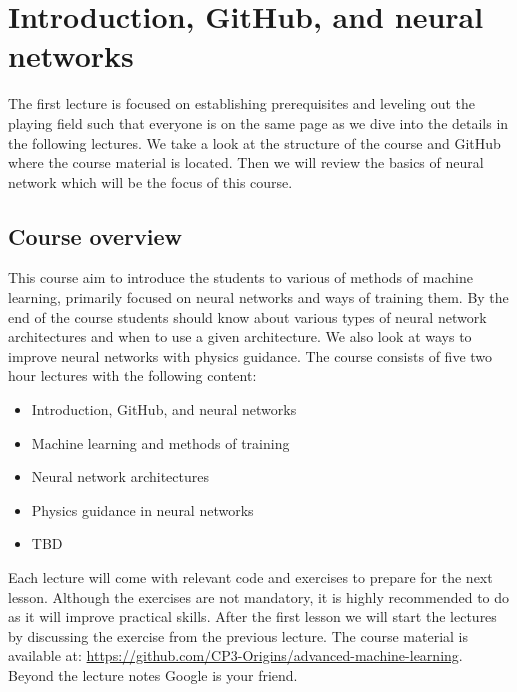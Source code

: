 \documentclass[12pt,a4paper]{article} %
\title{\titel}
\author{\navn}
\date{\dato}
\numberwithin{equation}{section}
\begin{document}
	
	\maketitle

\section{Introduction, GitHub, and neural networks}\label{sec:lecture1}
	The first lecture is focused on establishing prerequisites and leveling out the playing field such that everyone is on the same page as we dive into the details in the following lectures. We take a look at the structure of the course and GitHub where the course material is located. Then we will review the basics of neural network which will be the focus of this course.
	
	\subsection{Course overview}
		This course aim to introduce the students to various of methods of machine learning, primarily focused on neural networks and ways of training them. By the end of the course students should know about various types of neural network architectures and when to use a given architecture. We also look at ways to improve neural networks with physics guidance. The course consists of five two hour lectures with the following content:
		\begin{itemize}
			\item Introduction, GitHub, and neural networks
			\item Machine learning and methods of training
			\item Neural network architectures
			\item Physics guidance in neural networks
			\item TBD
		\end{itemize}
		Each lecture will come with relevant code and exercises to prepare for the next lesson. Although the exercises are not mandatory, it is highly recommended to do as it will improve practical skills. After the first lesson we will start the lectures by discussing the exercise from the previous lecture. The course material is available at: \url{https://github.com/CP3-Origins/advanced-machine-learning}. Beyond the lecture notes Google is your friend.
	
\end{document}
